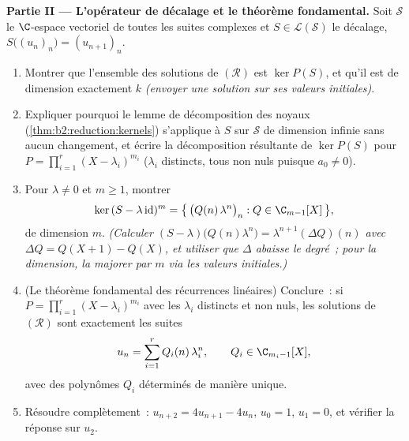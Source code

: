 \begin{problem}
\medskip
\noindent\textbf{Partie II --- L'opérateur de décalage et le théorème
fondamental.} Soit $\mathcal{S}$ le $\C$-espace vectoriel de toutes
les suites complexes et $S \in \mathcal{L}(\mathcal{S})$ le décalage,
$S\bigl((u_n)_n\bigr) = (u_{n+1})_n$.
\begin{enumerate}[resume]
  \item Montrer que l'ensemble des solutions de $(\mathcal R)$ est
        $\ker P(S)$, et qu'il est de dimension exactement $k$
        \emph{(envoyer une solution sur ses valeurs initiales)}.
  \item Expliquer pourquoi le lemme de décomposition des noyaux
        (\cref{thm:b2:reduction:kernels}) s'applique à $S$ sur
        $\mathcal{S}$ de dimension infinie sans aucun changement, et
        écrire la décomposition résultante de $\ker P(S)$ pour $P =
        \prod_{i=1}^{r}(X - \lambda_i)^{m_i}$ ($\lambda_i$ distincts,
        tous non nuls puisque $a_0 \neq 0$).
  \item Pour $\lambda \neq 0$ et $m \geq 1$, montrer
        \[
        \ker\,(S - \lambda\,\mathrm{id})^m
        = \bigl\{\,\bigl(Q(n)\,\lambda^n\bigr)_n : Q \in
        \C_{m-1}[X]\,\bigr\},
        \]
        de dimension $m$. \emph{(Calculer $(S -
        \lambda)\bigl(Q(n)\lambda^n\bigr) =
        \lambda^{n+1}(\Delta Q)(n)$ avec $\Delta Q = Q(X + 1) -
        Q(X)$, et utiliser que $\Delta$ abaisse le degré~; pour la
        dimension, la majorer par $m$ via les valeurs initiales.)}
  \item (Le théorème fondamental des récurrences linéaires) Conclure~:
        si $P = \prod_{i=1}^{r}(X - \lambda_i)^{m_i}$ avec les
        $\lambda_i$ distincts et non nuls, les solutions de $(\mathcal
        R)$ sont exactement les suites
        \[
        u_n = \sum_{i=1}^{r} Q_i(n)\,\lambda_i^n,
        \qquad Q_i \in \C_{m_i - 1}[X],
        \]
        avec des polynômes $Q_i$ déterminés de manière unique.
  \item Résoudre complètement~: $u_{n+2} = 4u_{n+1} - 4u_n$, $u_0 =
        1$, $u_1 = 0$, et vérifier la réponse sur $u_2$.
\end{enumerate}


\end{problem}
